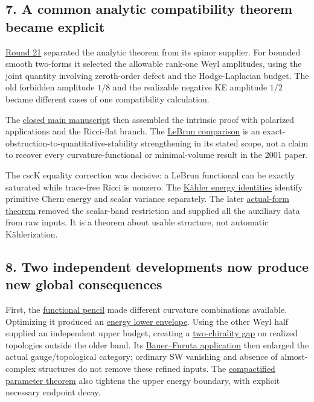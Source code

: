 \documentclass[
  10pt,
]{article}
\begin{document}
\hypertarget{a-common-analytic-compatibility-theorem-became-explicit}{%
\subsection{7. A common analytic compatibility theorem became
explicit}\label{a-common-analytic-compatibility-theorem-became-explicit}}

\href{../mathematics/current/round21_analytic.md}{Round 21} separated
the analytic theorem from its spinor supplier. For bounded smooth
two-forms it selected the allowable rank-one Weyl amplitudes, using the
joint quantity involving zeroth-order defect and the Hodge-Laplacian
budget. The old forbidden amplitude \(1/8\) and the realizable negative
KE amplitude \(1/2\) became different cases of one compatibility
calculation.

The
\href{../mathematics/current/line1_integral_rigidity_paper.md}{closed
main manuscript} then assembled the intrinsic proof with polarized
applications and the Ricci-flat branch. The
\href{../mathematics/current/round21_comparison.md}{LeBrun comparison}
is an exact-obstruction-to-quantitative-stability strengthening in its
stated scope, not a claim to recover every curvature-functional or
minimal-volume result in the 2001 paper.

The cscK equality correction was decisive: a LeBrun functional can be
exactly saturated while trace-free Ricci is nonzero. The
\href{../mathematics/current/line1_kahler_energy.md}{Kähler energy
identities} identify primitive Chern energy and scalar variance
separately. The later
\href{../mathematics/current/line1_composed_application.md}{actual-form
theorem} removed the scalar-band restriction and supplied all the
auxiliary data from raw inputs. It is a theorem about usable structure,
not automatic Kählerization.

\hypertarget{two-independent-developments-now-produce-new-global-consequences}{%
\subsection{8. Two independent developments now produce new global
consequences}\label{two-independent-developments-now-produce-new-global-consequences}}

First, the
\href{../mathematics/current/line1_functional_pencil.md}{functional
pencil} made different curvature combinations available. Optimizing it
produced an
\href{../mathematics/current/line1_energy_envelope_gap.md}{energy lower
envelope}. Using the other Weyl half supplied an independent upper
budget, creating a
\href{../mathematics/current/line1_two_chirality_topology.md}{two-chirality
gap} on realized topologies outside the older band. Its
\href{../mathematics/current/line1_bauer_furuta_geography.md}{Bauer--Furuta
application} then enlarged the actual gauge/topological category;
ordinary SW vanishing and absence of almost-complex structures do not
remove these refined inputs. The
\href{../mathematics/current/line1_compactified_pencil.md}{compactified
parameter theorem} also tightens the upper energy boundary, with
explicit necessary endpoint decay.
\end{document}
